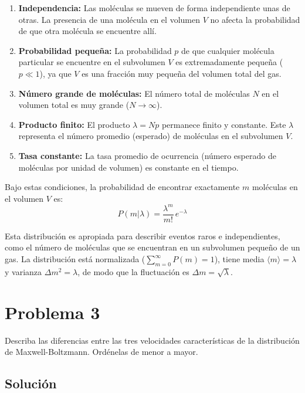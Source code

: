 \documentclass[a4paper]{article}
\begin{document}
\begin{enumerate}
    \item \textbf{Independencia:} Las moléculas se mueven de forma independiente unas de otras. La presencia de una molécula en el volumen $V$ no afecta la probabilidad de que otra molécula se encuentre allí.

    \item \textbf{Probabilidad pequeña:} La probabilidad $p$ de que cualquier molécula particular se encuentre en el subvolumen $V$ es extremadamente pequeña ($p \ll 1$), ya que $V$ es una fracción muy pequeña del volumen total del gas.

    \item \textbf{Número grande de moléculas:} El número total de moléculas $N$ en el volumen total es muy grande ($N \to \infty$).

    \item \textbf{Producto finito:} El producto $\lambda = Np$ permanece finito y constante. Este $\lambda$ representa el número promedio (esperado) de moléculas en el subvolumen $V$.

    \item \textbf{Tasa constante:} La tasa promedio de ocurrencia (número esperado de moléculas por unidad de volumen) es constante en el tiempo.
\end{enumerate}

Bajo estas condiciones, la probabilidad de encontrar exactamente $m$ moléculas en el volumen $V$ es:
$$
P(m|\lambda) = \frac{\lambda^m}{m!}\,e^{-\lambda}
$$

Esta distribución es apropiada para describir eventos raros e independientes, como el número de moléculas que se encuentran en un subvolumen pequeño de un gas. La distribución está normalizada ($\sum_{m=0}^{\infty} P(m) = 1$), tiene media $\langle m \rangle = \lambda$ y varianza $\Delta m^2 = \lambda$, de modo que la fluctuación es $\Delta m = \sqrt{\lambda}$.

\section{Problema 3}
Describa las diferencias entre las tres velocidades características de la distribución de Maxwell-Boltzmann. Ordénelas de menor a mayor.

\subsection{Solución}
\end{document}
